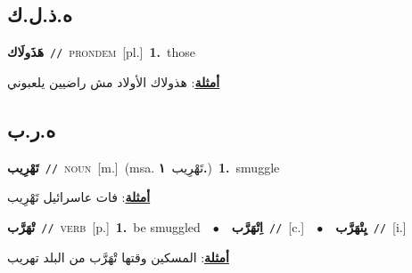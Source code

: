 \documentclass[10pt,a4paper,twoside]{article} %
\begin{document}
\begin{multicols}{2}
\vspace{-3mm}
\subsection*{\color{blue}\foreignlanguage{arabic}{ه.ذ.ل.ك}\color{blue}{ (ntws)}} 

{\setlength\topsep{0pt}\textbf{\foreignlanguage{arabic}{هَذَولَاك}}\ {\color{gray}\texttt{//}\color{black}}\ \textsc{pron\textunderscore dem}\ [pl.]\ \textbf{1.}~those\  \begin{flushright}\color{gray}\foreignlanguage{arabic}{\textbf{\underline{\foreignlanguage{arabic}{أمثلة}}}: هذولاك الأولاد مش راضيين يلعبوني}\end{flushright}\color{black}} \vspace{2mm}

\vspace{-3mm}
\subsection*{\color{blue}\foreignlanguage{arabic}{ه.ر.ب}\color{blue}{}} 

{\setlength\topsep{0pt}\textbf{\foreignlanguage{arabic}{تَهْرِيب}}\ {\color{gray}\texttt{//}\color{black}}\ \textsc{noun}\ [m.]\ \color{gray}(msa. \foreignlanguage{arabic}{تَهْرِيب}~\foreignlanguage{arabic}{\textbf{١.}})\color{black}\ \textbf{1.}~smuggle\  \begin{flushright}\color{gray}\foreignlanguage{arabic}{\textbf{\underline{\foreignlanguage{arabic}{أمثلة}}}: فات عاسرائيل تَهْرِيب}\end{flushright}\color{black}} \vspace{2mm}

{\setlength\topsep{0pt}\textbf{\foreignlanguage{arabic}{تْهَرَّب}}\ {\color{gray}\texttt{//}\color{black}}\ \textsc{verb}\ [p.]\ \textbf{1.}~be smuggled\ \ $\bullet$\ \ \setlength\topsep{0pt}\textbf{\foreignlanguage{arabic}{اِتْهَرَّب}}\ {\color{gray}\texttt{//}\color{black}}\ [c.]\ \ $\bullet$\ \ \setlength\topsep{0pt}\textbf{\foreignlanguage{arabic}{يِتْهَرَّب}}\ {\color{gray}\texttt{//}\color{black}}\ [i.]\  \begin{flushright}\color{gray}\foreignlanguage{arabic}{\textbf{\underline{\foreignlanguage{arabic}{أمثلة}}}: المسكين وقتها تْهَرَّب من البلد تهريب}\end{flushright}\color{black}} \vspace{2mm}


\end{multicols}
\end{document}
